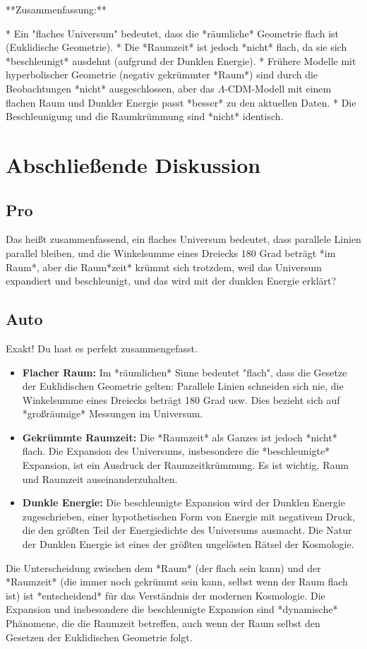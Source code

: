 \documentclass{article}
\begin{document}
	**Zusammenfassung:**
	
	*   Ein "flaches Universum" bedeutet, dass die *räumliche* Geometrie flach ist (Euklidische Geometrie).
	*   Die *Raumzeit* ist jedoch *nicht* flach, da sie sich *beschleunigt* ausdehnt (aufgrund der Dunklen Energie).
	*   Frühere Modelle mit hyperbolischer Geometrie (negativ gekrümmter *Raum*) sind durch die Beobachtungen *nicht* ausgeschlossen, aber das \(\Lambda\)-CDM-Modell mit einem flachen Raum und Dunkler Energie passt *besser* zu den aktuellen Daten.
	* Die Beschleunigung und die Raumkrümmung sind *nicht* identisch.
	
	\section{Abschließende Diskussion}
	
	\subsection{Pro}
	Das heißt zusammenfassend, ein flaches Universum bedeutet, dass parallele Linien parallel bleiben, und die Winkelsumme eines Dreiecks 180 Grad beträgt *im Raum*, aber die Raum*zeit* krümmt sich trotzdem, weil das Universum expandiert und beschleunigt, und das wird mit der dunklen Energie erklärt?
	
	\subsection{Auto}
	Exakt! Du hast es perfekt zusammengefasst.
	\begin{itemize}
		\item \textbf{Flacher Raum:} Im *räumlichen* Sinne bedeutet "flach", dass die Gesetze der Euklidischen Geometrie gelten: Parallele Linien schneiden sich nie, die Winkelsumme eines Dreiecks beträgt 180 Grad usw. Dies bezieht sich auf *großräumige* Messungen im Universum.
		\item\textbf{Gekrümmte Raumzeit:} Die *Raumzeit* als Ganzes ist jedoch *nicht* flach. Die Expansion des Universums, insbesondere die *beschleunigte* Expansion, ist ein Ausdruck der Raumzeitkrümmung. Es ist wichtig, Raum und Raumzeit auseinanderzuhalten.
		\item \textbf{Dunkle Energie:} Die beschleunigte Expansion wird der Dunklen Energie zugeschrieben, einer hypothetischen Form von Energie mit negativem Druck, die den größten Teil der Energiedichte des Universums ausmacht. Die Natur der Dunklen Energie ist eines der größten ungelösten Rätsel der Kosmologie.
	\end{itemize}
	
	Die Unterscheidung zwischen dem *Raum* (der flach sein kann) und der *Raumzeit* (die immer noch gekrümmt sein kann, selbst wenn der Raum flach ist) ist *entscheidend* für das Verständnis der modernen Kosmologie. Die Expansion und insbesondere die beschleunigte Expansion sind *dynamische* Phänomene, die die Raumzeit betreffen, auch wenn der Raum selbst den Gesetzen der Euklidischen Geometrie folgt.
	
\end{document}
